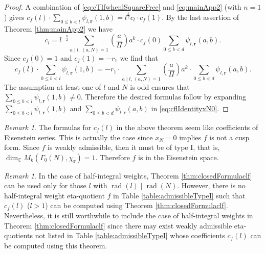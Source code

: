 \documentclass[12pt]{amsart}
\numberwithin{equation}{section}
\theoremstyle{plain}
\theoremstyle{definition}
\theoremstyle{remark}
\newtheorem{rema}[thm]{Remark}
\newcommand\legendre[2]{\genfrac{(}{)}{}{}{#1}{#2}}
\newcommand\rad{\mathop{\mathrm{rad}}}
\newcommand\numC{\mathbb{C}}
\begin{document}
\begin{proof}
A combination of \eqref{eq:cTlfwhenlSquareFree} and \eqref{eq:mainApp2} (with $n=1$) gives $c_f(l)\cdot\sum_{0\leq b<l}\psi_{l,\mathbf{r}}(1,b)=l^{\frac{k}{2}}c_l\cdot c_f(1)$. By the last assertion of Theorem \ref{thm:mainApp2} we have
$$
c_l=l^{-\frac{k}{2}}\sum_{a\mid l,\,(a,N)=1}\legendre{a}{\varPi}a^k\cdot c_f(0)\sum_{0\leq b<d}\psi_{l,\mathbf{r}}(a,b).
$$
Since $c_f(0)=1$ and $c_f(1)=-r_1$ we find that
\begin{equation}
\label{eq:cflIdentityxN0}
c_f(l)\cdot\sum_{0\leq b<l}\psi_{l,\mathbf{r}}(1,b)=-r_1\cdot\sum_{a\mid l,\,(a,N)=1}\legendre{a}{\varPi}a^k\cdot\sum_{0\leq b<d}\psi_{l,\mathbf{r}}(a,b).
\end{equation}
The assumption at least one of $l$ and $N$ is odd ensures that $\sum_{0\leq b<l}\psi_{l,\mathbf{r}}(1,b)\neq0$. Therefore the desired formulas follow by expanding $\sum_{0\leq b<l}\psi_{l,\mathbf{r}}(1,b)$ and $\sum_{0\leq b<d}\psi_{l,\mathbf{r}}(a,b)$ in \eqref{eq:cflIdentityxN0}.
\end{proof}
\begin{rema}
The formulas for $c_f(l)$ in the above theorem seem like coefficients of Eisenstein series. This is actually the case since $x_N=0$ implies $f$ is not a cusp form. Since $f$ is weakly admissible, then it must be of type I, that is, $\dim_\numC M_k(\Gamma_0(N),\chi_\mathbf{r})=1$. Therefore $f$ is in the Eisenstein space.
\end{rema}
\begin{rema}
In the case of half-integral weights, Theorem \ref{thm:closedFormulaclf} can be used only for those $l$ with $\rad(l)\mid\rad(N)$. However, there is no half-integral weight eta-quotient $f$ in Table \ref{table:admissibleTypeI} such that $c_f(l)$ ($l>1$) can be computed using Theorem \ref{thm:closedFormulaclf}. Nevertheless, it is still worthwhile to include the case of half-integral weights in Theorem \ref{thm:closedFormulaclf} since there may exist weakly admissible eta-quotients not listed in Table \ref{table:admissibleTypeI} whose coefficients $c_f(l)$ can be computed using this theorem.
\end{rema}
\end{document}
